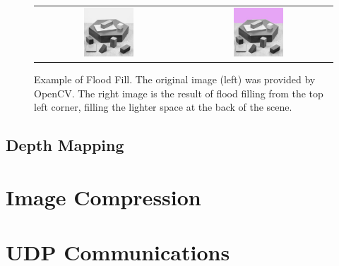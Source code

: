 \begin{figure}[H]
    \begin{center}
    \begin{tabular}{ c c }
        \includegraphics[width=0.35\textwidth]{Figures/blox.jpg} &
        \includegraphics[width=0.35\textwidth]{Figures/bloxFilled.jpg}
    \end{tabular}
    \caption[Example of Flood Fill]{Example of Flood Fill. The original image (left) was provided by OpenCV. The right image is the result of flood filling from the top left corner, filling the lighter space at the back of the scene.}
    \label{fig:EgFloodFill}
    \end{center}
\end{figure}

\subsection{Depth Mapping}

\section{Image Compression}

\section{UDP Communications}